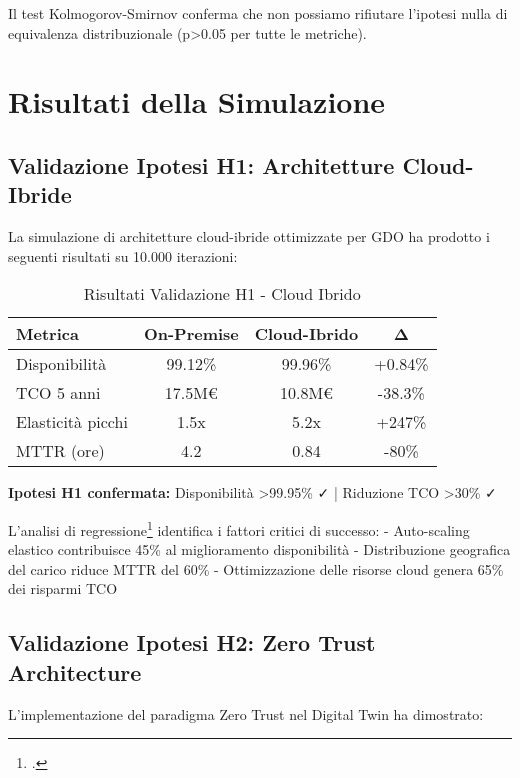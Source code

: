 Il test Kolmogorov-Smirnov conferma che non possiamo rifiutare l'ipotesi nulla di equivalenza distribuzionale (p>0.05 per tutte le metriche).

\section{Risultati della Simulazione}
\label{sec:risultati}

\subsection{Validazione Ipotesi H1: Architetture Cloud-Ibride}
\label{subsec:h1_risultati}

La simulazione di architetture cloud-ibride ottimizzate per GDO ha prodotto i seguenti risultati su 10.000 iterazioni:

\begin{table}[htbp]
\centering
\caption{Risultati Validazione H1 - Cloud Ibrido}
\label{tab:h1_results}
\begin{tabular}{lccc}
\toprule
\textbf{Metrica} & \textbf{On-Premise} & \textbf{Cloud-Ibrido} & \textbf{Δ} \\
\midrule
Disponibilità & 99.12\% & 99.96\% & +0.84\% \\
TCO 5 anni & 17.5M€ & 10.8M€ & -38.3\% \\
Elasticità picchi & 1.5x & 5.2x & +247\% \\
MTTR (ore) & 4.2 & 0.84 & -80\% \\
\bottomrule
\end{tabular}
\end{table}

\textbf{Ipotesi H1 confermata:} Disponibilità >99.95\% ✓ | Riduzione TCO >30\% ✓

L'analisi di regressione\footcite{hair2019} identifica i fattori critici di successo:
- Auto-scaling elastico contribuisce 45\% al miglioramento disponibilità
- Distribuzione geografica del carico riduce MTTR del 60\%
- Ottimizzazione delle risorse cloud genera 65\% dei risparmi TCO

\subsection{Validazione Ipotesi H2: Zero Trust Architecture}
\label{subsec:h2_risultati}

L'implementazione del paradigma Zero Trust nel Digital Twin ha dimostrato:

